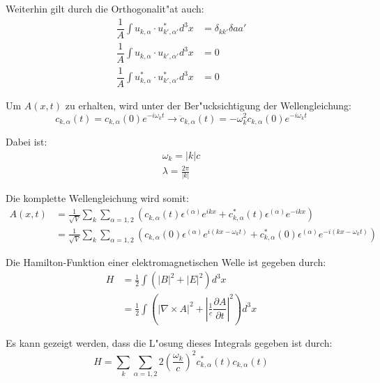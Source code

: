 Weiterhin gilt durch die Orthogonalit"at auch:
\begin{equation}
\begin{split}
\dfrac{1}{A} \int u_{k,\alpha} \cdot u^*_{k',\alpha'} d^3 x &= \delta_{kk'}\delta{aa'} \\
\dfrac{1}{A} \int u_{k,\alpha} \cdot u_{k',\alpha'} d^3 x &= 0 \\
\dfrac{1}{A} \int u^*_{k,\alpha} \cdot u^*_{k',\alpha'} d^3 x &= 0
\end{split}
\end{equation}

Um $A(x,t)$ zu erhalten, wird unter der Ber"ucksichtigung der Wellengleichung:
\begin{equation}
c_{k,\alpha}(t) = c_{k,\alpha}(0) e^{-i \omega_k t} \rightarrow \ddot{c}_{k,\alpha}(t) = -\omega_k^2 c_{k,\alpha}(0) e^{-i \omega_k t}
\end{equation}

Dabei ist:
\begin{equation}
\begin{split}
\omega_k=|k|c \\
\lambda = \frac{2 \pi}{|k|}
\end{split}
\end{equation}

Die komplette Wellengleichung wird somit:
\begin{equation} \label{fq:wave_eq}
\begin{split}
A(x,t) &= \frac{1}{\sqrt{V}} \sum_k \sum_{\alpha=1,2} (c_{k,\alpha}(t) \epsilon^{(\alpha)} e^{ikx} + c^*_{k,\alpha}(t) \epsilon^{(\alpha)} e^{-ikx}) \\
&= \frac{1}{\sqrt{V}} \sum_k \sum_{\alpha=1,2} (c_{k,\alpha}(0) \epsilon^{(\alpha)} e^{i (kx - \omega_k t)} + c^*_{k,\alpha}(0) \epsilon^{(\alpha)} e^{-i(kx - \omega_k t)})
\end{split}
\end{equation}

Die Hamilton-Funktion einer elektromagnetischen Welle ist gegeben durch:
\begin{equation}
\begin{split}
H &= \frac{1}{2} \int (|B|^2 + |E|^2) d^3 x \\
	&= \frac{1}{2} \int \left(| \nabla\times A |^2 + \left| \frac{1}{c} \dfrac{\partial A}{\partial t} \right|^2 \right) d^3 x 
\end{split}
\end{equation}

Es kann gezeigt werden, dass die L"osung dieses Integrals gegeben ist durch:
\begin{equation}
H = \sum_k \sum_{\alpha=1,2} 2 \left(\frac{\omega_k}{c}\right)^2 c^*_{k,\alpha}(t) c_{k,\alpha}(t)
\end{equation}

